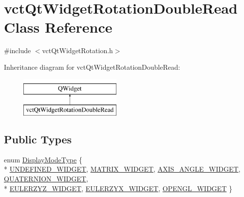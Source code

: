 \hypertarget{classvct_qt_widget_rotation_double_read}{}\section{vct\+Qt\+Widget\+Rotation\+Double\+Read Class Reference}
\label{classvct_qt_widget_rotation_double_read}


{\ttfamily \#include $<$vct\+Qt\+Widget\+Rotation.\+h$>$}

Inheritance diagram for vct\+Qt\+Widget\+Rotation\+Double\+Read\+:\begin{figure}[H]
\begin{center}
\leavevmode
\includegraphics[height=2.000000cm]{d4/d60/classvct_qt_widget_rotation_double_read}
\end{center}
\end{figure}
\subsection*{Public Types}
\begin{DoxyCompactItemize}
\item 
enum \hyperlink{classvct_qt_widget_rotation_double_read_a77ae5a0ee5fe231ad2f9dd020aad434c}{Display\+Mode\+Type} \{ \\*
\hyperlink{classvct_qt_widget_rotation_double_read_a77ae5a0ee5fe231ad2f9dd020aad434ca44f2e95cf2aa74f96e61297dd9d9a635}{U\+N\+D\+E\+F\+I\+N\+E\+D\+\_\+\+W\+I\+D\+G\+E\+T}, 
\hyperlink{classvct_qt_widget_rotation_double_read_a77ae5a0ee5fe231ad2f9dd020aad434cab4e7af571815b292da348c3526627d1e}{M\+A\+T\+R\+I\+X\+\_\+\+W\+I\+D\+G\+E\+T}, 
\hyperlink{classvct_qt_widget_rotation_double_read_a77ae5a0ee5fe231ad2f9dd020aad434caa75f45fc36381eb2add04f081db9e4bd}{A\+X\+I\+S\+\_\+\+A\+N\+G\+L\+E\+\_\+\+W\+I\+D\+G\+E\+T}, 
\hyperlink{classvct_qt_widget_rotation_double_read_a77ae5a0ee5fe231ad2f9dd020aad434ca7bafe70e904937d5d1fbf056d31cf976}{Q\+U\+A\+T\+E\+R\+N\+I\+O\+N\+\_\+\+W\+I\+D\+G\+E\+T}, 
\\*
\hyperlink{classvct_qt_widget_rotation_double_read_a77ae5a0ee5fe231ad2f9dd020aad434cab4a8bda77c869bea4ffd986641477262}{E\+U\+L\+E\+R\+Z\+Y\+Z\+\_\+\+W\+I\+D\+G\+E\+T}, 
\hyperlink{classvct_qt_widget_rotation_double_read_a77ae5a0ee5fe231ad2f9dd020aad434ca360cce806f5c77e80be67d68bf0c9f47}{E\+U\+L\+E\+R\+Z\+Y\+X\+\_\+\+W\+I\+D\+G\+E\+T}, 
\hyperlink{classvct_qt_widget_rotation_double_read_a77ae5a0ee5fe231ad2f9dd020aad434caf9ca8d54944bc35b1606430450b5e844}{O\+P\+E\+N\+G\+L\+\_\+\+W\+I\+D\+G\+E\+T}
 \}
\end{DoxyCompactItemize}
